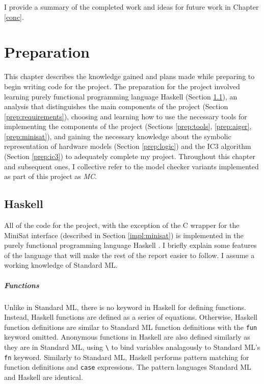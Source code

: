 \documentclass[12pt,a4paper,twoside,openright]{report}
\begin{document}
I provide a summary of the completed work and ideas for
future work in Chapter \ref{conc}.

\chapter{Preparation}
\label{prep}

This chapter describes the knowledge gained and plans made while preparing
to begin writing code for the project.
The preparation for the project involved learning purely functional
programming language Haskell (Section \ref{prep:haskell}),
an analysis that distinguishes the main components of the project
(Section \ref{prep:requirements}), choosing and learning how to use
the necessary tools for implementing the components of the project
(Sections \ref{prep:tools}, \ref{prep:aiger}, \ref{prep:minisat}),
and gaining the necessary knowledge about the symbolic representation
of hardware models
(Section \ref{prep:logic}) and the IC3 algorithm (Section \ref{prep:ic3}) to
adequately complete my project.
Throughout this chapter and subsequent ones, I collective refer to the model checker
variants implemented as part of this project as \emph{MC}.

\section{Haskell}
\label{prep:haskell}

All of the code for the project, with the exception of the C wrapper for the
MiniSat interface (described in Section \ref{impl:minisat})
is implemented in the purely functional
programming language Haskell \cite{haskell}.
I briefly explain some features of the
language that will make the rest of the report easier to follow.
I assume a working knowledge of Standard ML.

\paragraph{Functions}{
Unlike in Standard ML, there is no keyword in Haskell for defining functions. Instead,
Haskell functions are defined as a series of equations. Otherwise,
Haskell function definitions are similar to Standard ML function definitions with the
\verb,fun, keyword omitted. Anonymous functions in Haskell are also defined similarly
as they are in Standard ML, using \verb,\, to bind variables analagously to Standard
ML's \verb,fn, keyword. Similarly to Standard ML, Haskell performs pattern matching
for function definitions and \verb,case, expressions. The pattern languages Standard
ML and Haskell are identical.
}
\end{document}
